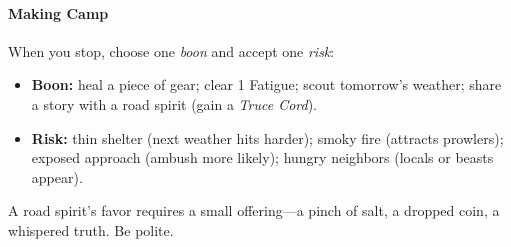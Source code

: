 \paragraph{Making Camp}
When you stop, choose one \emph{boon} and accept one \emph{risk}:
\begin{itemize}
  \item \textbf{Boon:} heal a piece of gear; clear 1 Fatigue; scout tomorrow's weather; share a story with a road spirit (gain a \emph{Truce Cord}).
  \item \textbf{Risk:} thin shelter (next weather hits harder); smoky fire (attracts prowlers); exposed approach (ambush more likely); hungry neighbors (locals or beasts appear).
\end{itemize}
A road spirit's favor requires a small offering---a pinch of salt, a dropped coin, a whispered truth. Be polite.

